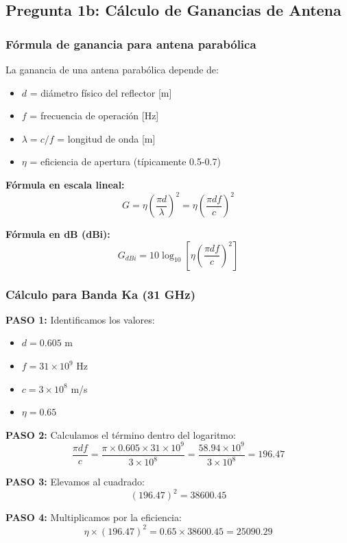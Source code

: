 \documentclass[a4paper,10pt]{article}
\begin{document}
\subsection{Pregunta 1b: Cálculo de Ganancias de Antena}

\subsubsection{Fórmula de ganancia para antena parabólica}

La ganancia de una antena parabólica depende de:
\begin{itemize}
    \item $d$ = diámetro físico del reflector [m]
    \item $f$ = frecuencia de operación [Hz]
    \item $\lambda = c/f$ = longitud de onda [m]
    \item $\eta$ = eficiencia de apertura (típicamente 0.5-0.7)
\end{itemize}

\textbf{Fórmula en escala lineal:}
$$G = \eta \left(\frac{\pi d}{\lambda}\right)^2 = \eta \left(\frac{\pi d f}{c}\right)^2$$

\textbf{Fórmula en dB (dBi):}
$$G_{dBi} = 10\log_{10}\left[\eta \left(\frac{\pi d f}{c}\right)^2\right]$$

\subsubsection{Cálculo para Banda Ka (31 GHz)}

\textbf{PASO 1:} Identificamos los valores:
\begin{itemize}
    \item $d = 0.605$ m
    \item $f = 31 \times 10^9$ Hz
    \item $c = 3 \times 10^8$ m/s
    \item $\eta = 0.65$
\end{itemize}

\textbf{PASO 2:} Calculamos el término dentro del logaritmo:
$$\frac{\pi d f}{c} = \frac{\pi \times 0.605 \times 31 \times 10^9}{3 \times 10^8} = \frac{58.94 \times 10^9}{3 \times 10^8} = 196.47$$

\textbf{PASO 3:} Elevamos al cuadrado:
$$(196.47)^2 = 38600.45$$

\textbf{PASO 4:} Multiplicamos por la eficiencia:
$$\eta \times (196.47)^2 = 0.65 \times 38600.45 = 25090.29$$
\end{document}
